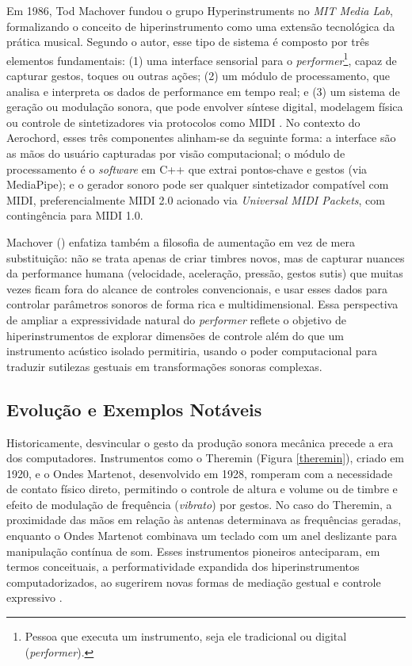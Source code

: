 Em 1986, Tod Machover fundou o grupo Hyperinstruments no \textit{MIT Media Lab}, formalizando o conceito de hiperinstrumento como uma extensão tecnológica da prática musical. Segundo o autor,  esse tipo de sistema é composto por três elementos fundamentais: (1) uma interface sensorial para o \textit{performer}\footnote{Pessoa que executa um instrumento, seja ele tradicional ou digital (\textit{performer}).}, capaz de capturar gestos, toques ou outras ações; (2) um módulo de processamento, que analisa e interpreta os dados de performance em tempo real; e (3) um sistema de geração ou modulação sonora, que pode envolver síntese digital, modelagem física ou controle de sintetizadores via protocolos como MIDI \cite{Machover1992}. No contexto do Aerochord, esses três componentes alinham-se da seguinte forma: a interface são as mãos do usuário capturadas por visão computacional; o módulo de processamento é o \textit{software} em C++ que extrai pontos-chave e gestos (via MediaPipe); e o gerador sonoro pode ser qualquer sintetizador compatível com MIDI, preferencialmente MIDI 2.0 acionado via \textit{Universal MIDI Packets}, com contingência para MIDI 1.0.

Machover (\citeyear{Machover1992}) enfatiza também a filosofia de aumentação em vez de mera substituição: não se trata apenas de criar timbres novos, mas de capturar nuances da performance humana (velocidade, aceleração, pressão, gestos sutis) que muitas vezes ficam fora do alcance de controles convencionais, e usar esses dados para controlar parâmetros sonoros de forma rica e multidimensional. Essa perspectiva de ampliar a expressividade natural do \textit{performer} reflete o objetivo de hiperinstrumentos de explorar dimensões de controle além do que um instrumento acústico isolado permitiria, usando o poder computacional para traduzir sutilezas gestuais em transformações sonoras complexas.

\subsection{Evolução e Exemplos Notáveis}
\label{sec:evolucao_e_exemplos_notaveis}

Historicamente, desvincular o gesto da produção sonora mecânica precede a era dos computadores. Instrumentos como o Theremin (Figura \ref{theremin}), criado em 1920, e o Ondes Martenot, desenvolvido em 1928, romperam com a necessidade de contato físico direto, permitindo o controle de altura e volume ou de timbre e efeito de modulação de frequência (\textit{vibrato}) por gestos. No caso do Theremin, a proximidade das mãos em relação às antenas determinava as frequências geradas, enquanto o Ondes Martenot combinava um teclado com um anel deslizante para manipulação contínua de som. Esses instrumentos pioneiros anteciparam, em termos conceituais, a performatividade expandida dos hiperinstrumentos computadorizados, ao sugerirem novas formas de mediação gestual e controle expressivo \cite{Manning1993}.

